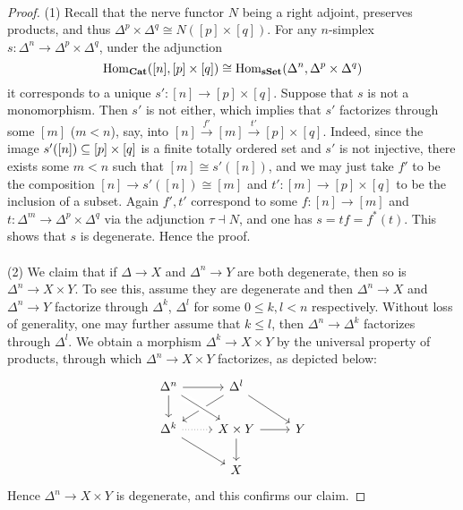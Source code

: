 \documentclass[a4paper,11pt,openany]{scrartcl}
\begin{document}
~\\
\begin{proof}
(1) Recall that the nerve functor $N$ being a right adjoint, preserves products, and thus $\Delta^p\times\Delta^q\cong N([p]\times[q])$. For any $n$-simplex $s\colon\Delta^n\to\Delta^p\times\Delta^q$, under the adjunction
\[
\operatorname{Hom}_{\operatorname{\mathbf{Cat}}}([n],[p]\times[q])\cong\operatorname{Hom}_{\operatorname{\mathbf{sSet}}}(\Delta^n,\Delta^p\times\Delta^q)
\]
it corresponds to a unique $s'\colon[n]\to[p]\times[q]$. Suppose that $s$ is not a monomorphism. Then $s'$ is not either, which implies that $s'$ factorizes through some $[m]$ ($m<n$), say, into $[n]\overset{f'}{\to}[m]\overset{t'}{\to}[p]\times[q]$. Indeed, since the image $s'([n])\subseteq[p]\times[q]$ is a finite totally ordered set and $s'$ is not injective, there exists some $m<n$ such that $[m]\cong s'([n])$, and we may just take $f'$ to be the composition $[n]\to s'([n])\cong[m]$ and $t'\colon[m]\to[p]\times[q]$ to be the inclusion of a subset. Again $f',t'$ correspond to some $f\colon[n]\to[m]$ and $t\colon\Delta^m\to\Delta^p\times\Delta^q$ via the adjunction $\tau\dashv N$, and one has $s=tf=f^*(t)$. This shows that $s$ is degenerate. Hence the proof.\\
\\
(2) We claim that if $\Delta\to X$ and $\Delta^n\to Y$ are both degenerate, then so is $\Delta^n\to X\times Y$. To see this, assume they are degenerate and then $\Delta^n\to X$ and $\Delta^n\to Y$ factorize through $\Delta^k$, $\Delta^l$ for some $0\leqslant k,l<n$ respectively. Without loss of generality, one may further assume that $k\leqslant l$, then $\Delta^n\to\Delta^k$ factorizes through $\Delta^l$. We obtain a morphism $\Delta^k\to X\times Y$ by the universal property of products, through which $\Delta^n\to X\times Y$ factorizes, as depicted below:
\[
\begin{tikzcd}
\Delta^n\arrow[r]\arrow[d]& \Delta^l\arrow[dr]\arrow[dl]&\\
\Delta^k\arrow[dr]\arrow[r,dotted]& X\times Y\arrow[r]\arrow[d]\arrow[from=ul,crossing over]& Y\\
& X&
\end{tikzcd}
\]
Hence $\Delta^n\to X\times Y$ is degenerate, and this confirms our claim.


\end{proof}
\end{document}
